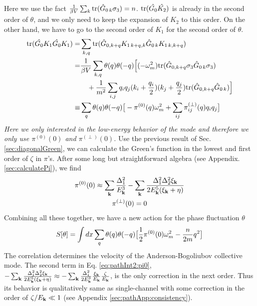 Here we use the fact $\frac{1}{{\beta{}V}}\sum_{k}\text{tr}(\hat{G}_{0\,k}\sigma_3)=n$. $\text{tr}(\hat{G_{0}}\hat{K_2})$ is already in the second order of $\theta$, and we only need to keep the expansion of $K_2$ to this order. On the other hand, we have to go to the second order of $K_1$ for the second order of $\theta$. 
\begin{align}		
\text{tr}(\hat{G_{0}}{K_1}\hat{G_{0}}{K_1})=&\sum_{k,q}\text{tr}(\hat{G}_{0,k+q}K_{1\,k+q,k}\hat{G}_{0\,k}K_{1\,k,k+q})\\
=&\frac{1}{{\beta{}V}}\sum_{k,q}\theta(q)\theta(-q)\Big[(-\omega_m^2)\text{tr}(\hat{G}_{0,k+q}\sigma_3\hat{G}_{0\,k}\sigma_3)\nonumber\\
&\quad+\frac{1}{m^2}\sum_{i,j}q_iq_j(k_i+\frac{q_i}{2})(k_j+\frac{q_j}{2})\text{tr}(\hat{G}_{0,k+q}\hat{G}_{0\,k})\Big]\nonumber\\
\equiv&\sum_{q}\theta(q)\theta(-q)\big[-\pi^{(0)}(q)\omega_m^2+\sum_{ij}\pi^{(\perp)}_{ij}(q)q_iq_j\big]
\end{align}
\emph{Here we only interested in the low-energy behavior of the mode and therefore we only use $\pi^{(0)}(0)$ and $\pi^{(\perp)}(0)$.} Use the previous result of Sec. \ref{sec:diagonalGreen}, we can calculate the Green's function in the lowest and first order of $\zeta$ in $\pi$'s.  After some long but straightforward algebra (see Appendix. \ref{sec:calculatePi}), we find
\begin{gather}
\pi^{(0)}(0)\approx\sum_{\mathbf{k}}\frac{\Delta_{1}^{2}}{E_{\mathbf{k}}^{3}}
	-\sum_{\mathbf{k}}\frac{\Delta_{1}^{2}\Delta_{2}^{2}\xi_{\mathbf{k}}}{2E_{\mathbf{k}}^{5}(\xi_{\mathbf{k}}+\eta)}
\label{eq:pathInt2:pi0}\\
\pi^{(\perp)}(0)=0
\end{gather}
Combining all these together, we have a new action for the phase fluctuation $\theta$
\begin{equation}
S[\theta]=\int{dx}\sum_{q}\theta(q)\theta(-q)\big[\frac{1}{2}\pi^{(0)}(0)\omega_m^2-\frac{n}{2m}q^2\big]
\end{equation}
The correlation determines the velocity of the Anderson-Bogoliubov collective mode.  The second term in Eq. \eqref{eq:pathInt2:pi0}, $-\sum_{\mathbf{k}}\frac{\Delta_{1}^{2}\Delta_{2}^{2}\xi_{\mathbf{k}}}{2E_{\mathbf{k}}^{5}(\xi_{\mathbf{k}}+\eta)}\approx-\sum_{\mathbf{k}}\frac{\Delta_{1}^{2}}{2E_{\mathbf{k}}^{3}}\frac{\xi_{\mathbf{k}}}{E_{\mathbf{k}}}\frac{\zeta}{E_{\mathbf{k}}}$, is the only correction in the next order.  Thus its behavior is qualitatively same as  single-channel with some correction in the order of $\zeta/E_{\mathbf{k}}\ll1$ (see Appendix \ref{sec:pathApp:consistency}).


